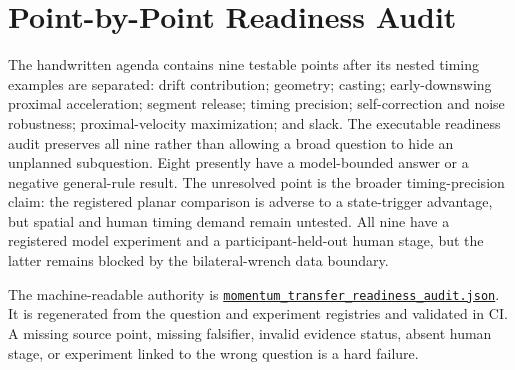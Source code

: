 \documentclass[
  letterpaper,
]{report}
\begin{document}
\section{Point-by-Point Readiness
Audit}\label{point-by-point-readiness-audit}

The handwritten agenda contains nine testable points after its nested
timing examples are separated: drift contribution; geometry; casting;
early-downswing proximal acceleration; segment release; timing
precision; self-correction and noise robustness; proximal-velocity
maximization; and slack. The executable readiness audit preserves all
nine rather than allowing a broad question to hide an unplanned
subquestion. Eight presently have a model-bounded answer or a negative
general-rule result. The unresolved point is the broader
timing-precision claim: the registered planar comparison is adverse to a
state-trigger advantage, but spatial and human timing demand remain
untested. All nine have a registered model experiment and a
participant-held-out human stage, but the latter remains blocked by the
bilateral-wrench data boundary.

The machine-readable authority is
\href{../data/momentum_transfer_readiness_audit.json}{\texttt{momentum\_transfer\_readiness\_audit.json}}.
It is regenerated from the question and experiment registries and
validated in CI. A missing source point, missing falsifier, invalid
evidence status, absent human stage, or experiment linked to the wrong
question is a hard failure.

\begingroup
\small
\end{document}
